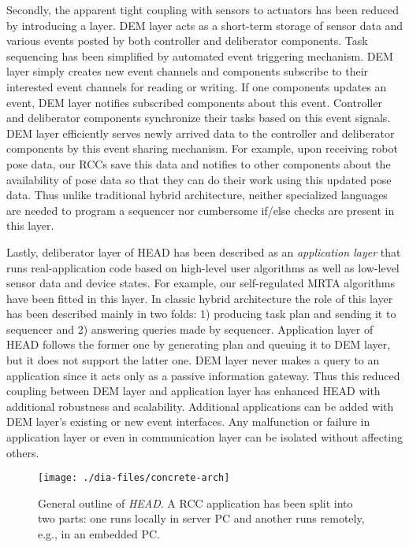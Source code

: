 Secondly, the apparent tight coupling with sensors to actuators has been reduced by introducing a  layer. DEM layer acts as a short-term storage of sensor data and various events posted by both controller and deliberator components. Task sequencing has been simplified by automated event triggering mechanism. DEM layer simply creates new event channels and components subscribe to their interested event channels for reading or writing. If one components updates an event, DEM layer notifies subscribed components about this event. Controller and deliberator components synchronize their tasks based on this event signals. DEM layer efficiently serves newly arrived data to the controller and deliberator components by this event sharing mechanism. For example, upon receiving robot pose data, our RCCs save this data and notifies to other components about the availability of pose data so that they can do their work using this updated pose data. Thus unlike traditional hybrid architecture, neither specialized languages are needed to program a sequencer nor cumbersome if/else checks are present in this layer.

Lastly, deliberator layer of HEAD has been described as an {\em application layer} that runs real-application code based on high-level user algorithms as well as low-level sensor data and device states. For example, our self-regulated MRTA algorithms have been fitted in this layer. In classic hybrid architecture the role of this layer has been described mainly in two folds: 1) producing task plan and sending it to sequencer and 2) answering queries made by sequencer. Application layer of HEAD follows the former one by generating plan and queuing it to DEM layer, but it does not support the latter one. DEM layer never makes a query to an application since it acts only as a passive information gateway. Thus this reduced coupling between DEM layer and application layer has enhanced HEAD with additional robustness and scalability. Additional applications can be added with DEM layer's existing or new event interfaces. Any malfunction or failure in application layer or even in communication layer can be isolated without affecting others. 
\begin{sidewaysfigure}
\begin{center}
\texttt{[image: ./dia-files/concrete-arch]} 
\caption{General outline of {\em HEAD}. A RCC application has been split into two parts: one runs locally in server PC and another runs remotely, e.g., in an embedded PC.} 
\label{fig:concrete-arch}
\end{center}
\end{sidewaysfigure}
